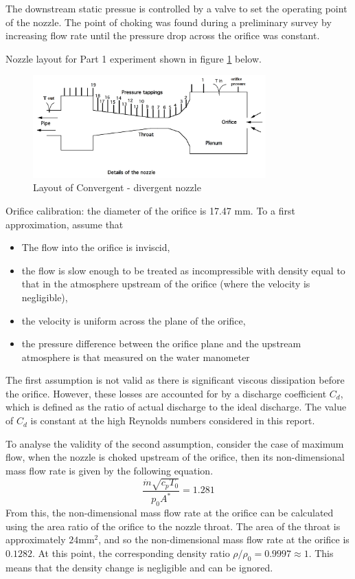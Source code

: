 \documentclass[8pt]{article}
\begin{document}
The downstream static pressue is controlled by a valve to set the operating point of the nozzle.
The point of choking was found during a preliminary survey by increasing flow rate until the pressure drop across the orifice was constant.

Nozzle layout for Part 1 experiment shown in figure \ref{fig:figure1} below.

\begin{figure}[H]
    \centering
    \includegraphics[width=0.8\textwidth]{small_nozzle_layout.png}
    \caption{Layout of Convergent - divergent nozzle}
    \label{fig:figure1}
\end{figure}

Orifice calibration: the diameter of the orifice is 17.47 mm. To a first approximation, assume that
\begin{itemize}
    \item The flow into the orifice is inviscid,
    \item the flow is slow enough to be treated as incompressible with density equal to that in the atmosphere upstream of the orifice (where the velocity is negligible),
    \item the velocity is uniform across the plane of the orifice,
    \item the pressure difference between the orifice plane and the upstream atmosphere is that measured on the
    water manometer
\end{itemize} 

The first assumption is not valid as there is significant viscous dissipation before the orifice. However, these losses are accounted for by a discharge coefficient $C_d$, which is defined as the ratio of actual discharge to the ideal discharge.
The value of $C_d$ is constant at the high Reynolds numbers considered in this report.

To analyse the validity of the second assumption, consider the case of maximum flow, when the nozzle is choked upstream of the orifice, then its non-dimensional mass flow rate is given by the following equation.
\begin{equation}
    \frac{\dot{m}\sqrt{c_pT_0}}{p_0A^*} = 1.281
\end{equation}
From this, the non-dimensional mass flow rate at the orifice can be calculated using the area ratio of the orifice to the nozzle throat.
The area of the throat is approximately $24\text{mm}^2$, and so the non-dimensional mass flow rate at the orifice is $0.1282$.
At this point, the corresponding density ratio $\rho/\rho_0 = 0.9997 \approx 1$. This means that the density change is negligible and can be ignored.
\end{document}
